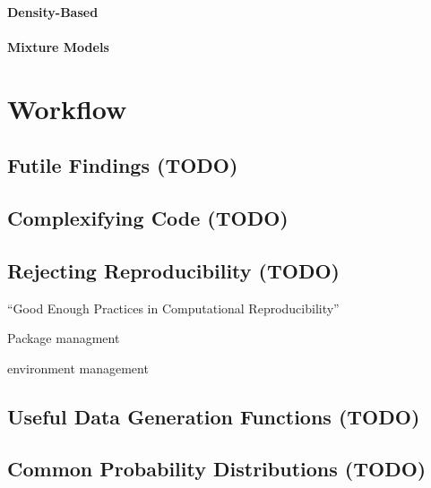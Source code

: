 \documentclass[
]{krantz}
\begin{document}
\hypertarget{density-based}{%
\subsection{Density-Based}\label{density-based}}

\hypertarget{mixture-models}{%
\subsection{Mixture Models}\label{mixture-models}}

\hypertarget{part-workflow}{%
\part*{Workflow}\label{part-workflow}}


\hypertarget{futi-find}{%
\chapter{Futile Findings (TODO)}\label{futi-find}}

\hypertarget{comp-code}{%
\chapter{Complexifying Code (TODO)}\label{comp-code}}

\hypertarget{reje-repr}{%
\chapter{Rejecting Reproducibility (TODO)}\label{reje-repr}}

``Good Enough Practices in Computational Reproducibility'' \citep{wilson_bryan_cranston_kitzes_nederbragt_teal_2017}

Package managment \citep{R-renv}

environment management

\cleardoublepage

\hypertarget{appendix-appendix}{%
\appendix {}}


\hypertarget{useful-data-generation-functions-todo}{%
\chapter{Useful Data Generation Functions (TODO)}\label{useful-data-generation-functions-todo}}

\hypertarget{common-probability-distributions-todo}{%
\chapter{Common Probability Distributions (TODO)}\label{common-probability-distributions-todo}}

  

\backmatter
\printindex
\end{document}
